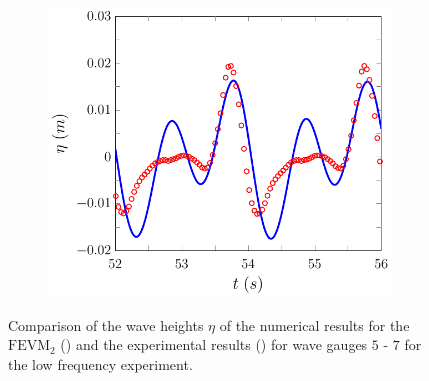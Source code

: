 \begin{figure}
\begin{subfigure}{0.5\textwidth}
		\vspace{0.5cm}
	\end{subfigure}
	\begin{subfigure}{0.5\textwidth}
		\includegraphics[width=\textwidth]{./chp6/figures/Experiment/Beji/sl/FEVMWG7.pdf}
		\vspace{0.5cm}
	\end{subfigure}
	\caption{Comparison of the wave heights $\eta$ of the numerical results for the $\text{FEVM}_2$ ({\color{blue}\solidrule}) and the experimental results () for wave gauges $5$ - $7$ for the low frequency experiment.}
	\label{fig:BejislWG5to7FEVM}
\end{figure}


